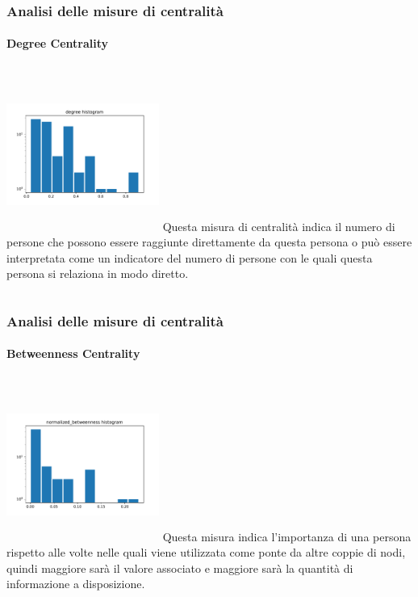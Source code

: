 \documentclass{beamer}
\begin{document}
\begin{frame}
\frametitle{Analisi delle misure di centralità}
\framesubtitle{Degree Centrality}
\begin{columns}
             \centering
             \includegraphics[height=5cm, width=5cm]{misure_grafo/degree.pdf}
              Questa misura di centralità indica il numero di persone che possono essere raggiunte direttamente da questa persona o può essere interpretata come un indicatore del numero di persone con le quali questa persona si relaziona in modo diretto. 
         \end{columns} 

\end{frame}


\begin{frame}
\frametitle{Analisi delle misure di centralità}
\framesubtitle{Betweenness Centrality}
\begin{columns}
             \centering
             \includegraphics[height=5cm, width=5cm]{misure_grafo/normalized_betweenness.pdf}
              Questa misura indica l'importanza di una persona rispetto alle volte nelle quali viene utilizzata come ponte da altre coppie di nodi, quindi maggiore sarà il valore associato e maggiore sarà la quantità di informazione a disposizione. 
         \end{columns} 

\end{frame}
\end{document}

